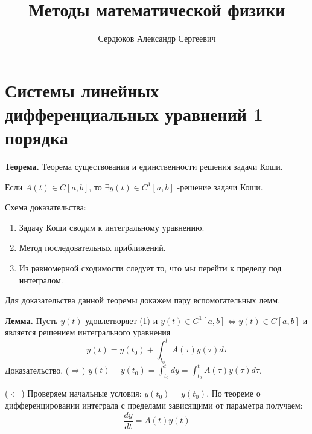 \documentclass[12pt]{article}
\newcommand{\equals}{\Leftrightarrow}
\newcommand{\thr}{{\bfseries Теорема. }}
\newcommand{\lem}{{\bfseries Лемма. }}
\begin{document}
	\title{Методы математической физики}
	\author{Сердюков Александр Сергеевич}
	\date{}
	\maketitle
	
	\section{Системы линейных дифференциальных уравнений 1 порядка}
	
	\thr Теорема существования и единственности решения задачи Коши.
	
	Если $A(t) \in C[a,b]$, то $\exists y(t) \in C^1[a,b] $ -решение задачи Коши.
	
	Схема доказательства:
	\begin{enumerate}
		\item Задачу Коши сводим к интегральному уравнению.
		\item Метод последовательных приближений.
		\item Из равномерной сходимости следует то, что мы перейти к пределу под интегралом.
	\end{enumerate}
	
	Для доказательства данной теоремы докажем пару вспомогательных лемм.
	
	\lem Пусть $y(t)$ удовлетворяет (1) и $y(t) \in C^1[a,b] \equals y(t) \in C[a,b]$ и является решением интегрального уравнения 
	$$ y(t) = y(t_0) + \int_{t_0}^t A(\tau)y(\tau)d\tau$$
	Доказательство. 
	($\Rightarrow$) $y(t) - y(t_0) = \int_{t_0}^t dy= \int_{t_0}^t A(\tau)y(\tau)d\tau$. 
	
	($\Leftarrow$) Проверяем начальные условия: $y(t_0) = y(t_0)$. По теореме о дифференцировании интеграла с пределами зависящими от параметра получаем:
	$$\frac{dy}{dt} = A(t)y(t)$$
	\raggedright{\bigtriangleup}
\end{document}
